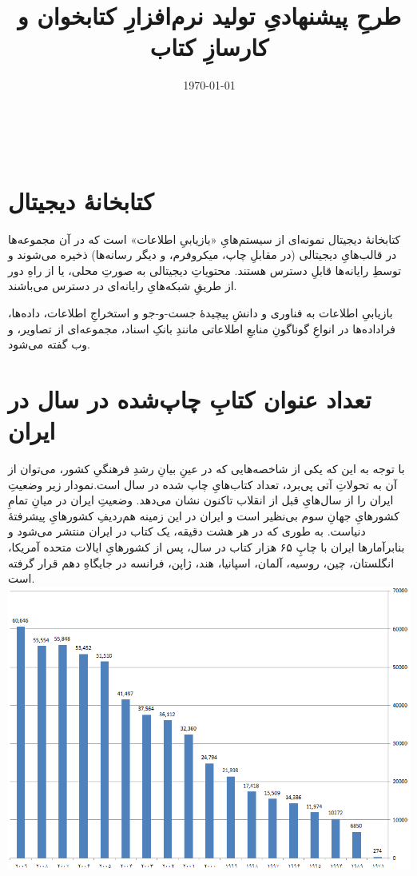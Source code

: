 \documentclass[]{article}
\begin{document}
\title{طرحِ پیشنهادیِ تولید نرم‌افزارِ کتابخوان و کارسازِ کتاب}

\date{\today}
\maketitle
‎\newpage
\tableofcontents
\newpage


\section{کتابخانهٔ دیجیتال}
کتابخانهٔ دیجیتال نمونه‌ای از سیستم‌هایِ «بازیابیِ اطلاعات»
است که در آن مجموعه‌ها در قالب‌هایِ دیجیتالی (در مقابلِ چاپ، میکروفرم، و دیگر رسانه‌ها) ذخیره می‌شوند و توسطِ رایانه‌ها قابلِ دسترس هستند. محتویاتِ دیجیتالی به صورتِ محلی، یا از راهِ دور از طریقِ شبکه‌هایِ رایانه‌ای در دسترس می‌باشند.

بازیابیِ اطلاعات به فناوری و دانشِ پیچیدهٔ جست-و-جو و استخراجِ اطلاعات، داده‌ها، فراداده‌ها در انواعِ گوناگونِ منابعِ اطلاعاتی مانندِ بانکِ اسناد، مجموعه‌ای از تصاویر، و وب گفته می‌شود.

\section{تعداد عنوان کتابِ چاپ‌شده در سال در ایران}
با توجه به این که یکی از شاخصه‌هایی که در عینِ بیانِ رشدِ فرهنگیِ کشور، می‌توان از آن به تحولاتِ آتی پی‌برد، تعداد کتاب‌هایِ چاپ شده در سال است.نمودار زیر وضعیتِ ایران را از سال‌هایِ قبل از انقلاب تاکنون نشان می‌دهد. وضعیتِ ایران در میانِ تمامِ کشورهایِ جهانِ سوم بی‌نظیر است و ایران در این زمینه هم‌ردیفِ کشورهایِ پیشرفتهٔ دنیاست. به طوری که در هر هشت دقیقه، یک کتاب در ایران منتشر می‌شود و بنابرآمارها ایران با چاپِ ۶۵ هزار کتاب در سال، پس از کشورهایِ ايالات متحده آمريكا، انگلستان، چين، روسيه، آلمان، اسپانيا، هند، ژاپن، فرانسه در جایگاهِ دهم قرار گرفته است.
\nocite{Doe:2009:Other,
Doe:2009:Misc,
Doe:2009:Booklet}
\includegraphics[scale=0.40]{books-of-iran.png}
\end{document}
